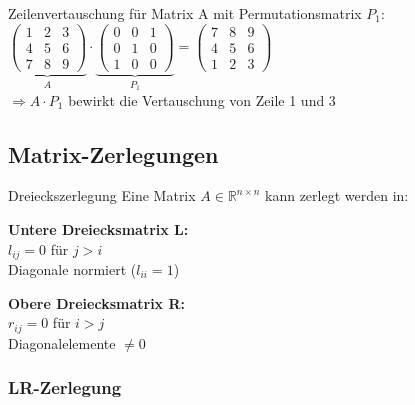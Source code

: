 \begin{example2}{Zeilenvertauschung} für Matrix A mit Permutationsmatrix $P_1$:\\

$\underbrace{\begin{pmatrix}
1 & 2 & 3\\
4 & 5 & 6\\
7 & 8 & 9
\end{pmatrix}}_{A} \cdot 
\underbrace{\begin{pmatrix}
0 & 0 & 1\\
0 & 1 & 0\\
1 & 0 & 0
\end{pmatrix}}_{P_1} =
\begin{pmatrix}
7 & 8 & 9\\
4 & 5 & 6\\
1 & 2 & 3
\end{pmatrix}$
\vspace{2mm}\\
$\Rightarrow A \cdot P_1$ bewirkt die Vertauschung von Zeile 1 und 3
\end{example2}

\subsection{Matrix-Zerlegungen}

\begin{definition}{Dreieckszerlegung}
Eine Matrix $A \in \mathbb{R}^{n\times n}$ kann zerlegt werden in:
\vspace{1mm}\\
\begin{minipage}[t]{0.5\textwidth}
    \textbf{Untere Dreiecksmatrix L:}\\
    $l_{ij} = 0$ für $j > i$\\
    Diagonale normiert ($l_{ii}=1$)
\end{minipage}
\hspace{3mm}
\begin{minipage}[t]{0.45\textwidth}
    \textbf{Obere Dreiecksmatrix R:}\\
    $r_{ij} = 0$ für $i > j$\\
    Diagonalelemente $\neq 0$
\end{minipage}
\end{definition}

\subsubsection{LR-Zerlegung}


